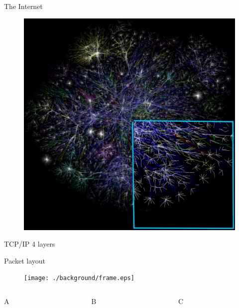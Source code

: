 \begin{frame}
The Internet
\begin{figure}
	\centering
\includegraphics[scale=0.25]{./background/internet_map_30p.png}
\end{figure}
\end{frame}


\begin{frame}
TCP/IP 4 layers


\end{frame}


\begin{frame}
Packet layout
\begin{figure}
	\centering
\texttt{[image: ./background/frame.eps]}
\end{figure}

\begin{columns}
\begin{column}{0.3\textwidth}
A
\end{column}

\begin{column}{0.3\textwidth}
B
\end{column}

\begin{column}{0.3\textwidth}
C
\end{column}


\end{columns}




\end{frame}

